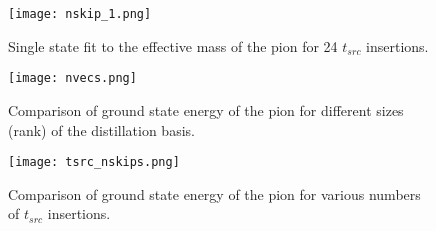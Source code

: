 \begin{figure}[h]
    \centering
    \texttt{[image: nskip\_1.png]}
    \caption{Single state fit to the effective mass of the pion for 24 $t_{src}$ insertions.}
    \label{fig:figure4}
\end{figure}

\newpage

\begin{figure}[h]
    \centering
    \texttt{[image: nvecs.png]}
    \caption{Comparison of ground state energy of the pion for different sizes (rank) of the distillation basis.}
    \label{fig:figure2}
\end{figure}

\begin{figure}[h]
    \centering
    \texttt{[image: tsrc\_nskips.png]}
    \caption{Comparison of ground state energy of the pion for various numbers of $t_{src}$ insertions.}
    \label{fig:figure3}
\end{figure}


